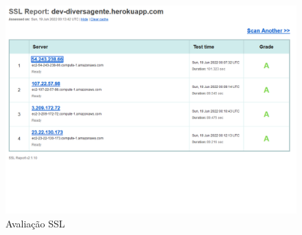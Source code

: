 \begin{figure}[htb]
	\centering
	\caption{\label{ssl-metrica}Avaliação SSL}
	\includegraphics[width=1\textwidth]{anexos/SSLMetrica.png}
\end{figure}
